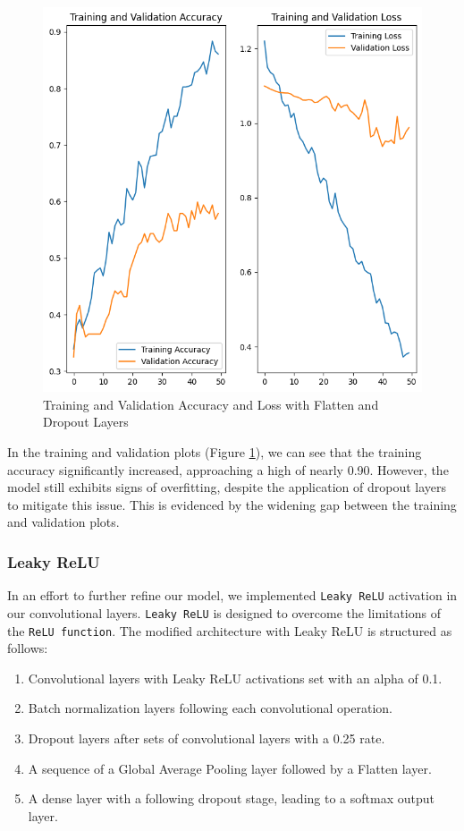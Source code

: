 \begin{figure}[H]
  \includegraphics[width=\linewidth]{figures/flatten_model.png}
  \caption{Training and Validation Accuracy and Loss with Flatten and Dropout Layers}
  \label{fig:flatten_model}
\end{figure}

In the training and validation plots (Figure \ref{fig:flatten_model}), we can see that the training accuracy significantly increased, approaching a high of nearly 0.90. However, the model still exhibits signs of overfitting, despite the application of dropout layers to mitigate this issue. This is evidenced by the widening gap between the training and validation plots.

\subsubsection{Leaky ReLU}

In an effort to further refine our model, we implemented \texttt{Leaky ReLU} activation in our convolutional layers. \texttt{Leaky ReLU} is designed to overcome the limitations of the \texttt{ReLU function}. The modified architecture with Leaky ReLU is structured as follows:

\begin{enumerate}
  \item Convolutional layers with Leaky ReLU activations set with an alpha of 0.1.
  \item Batch normalization layers following each convolutional operation.
  \item Dropout layers after sets of convolutional layers with a 0.25 rate.
  \item A sequence of a Global Average Pooling layer followed by a Flatten layer.
  \item A dense layer with a following dropout stage, leading to a softmax output layer.
\end{enumerate}

